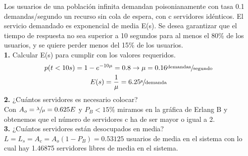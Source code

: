 \begin{exercise}[3]
Los usuarios de una población infinita demandan poisonianamente con tasa 0.1 demandas/segundo un recurso sin cola de espera, con c servidores idénticos. El servicio demandado es exponencial de media E(s). Se desea garantizar que el tiempo de respuesta no sea superior a 10 segundos para al menos el 80\% de los usuarios, y se quiere perder menos del 15\% de los usuarios.\\
\textbf{1.} Calcular E(s) para cumplir con los valores requeridos.\\
\begin{gather*}
p(t<10s)=1-e^{-10\mu}=0.8 \to \mu=0.16\sfrac{\text{demandas}}{\text{segundo}}\\
E(s)=\frac{1}{\mu}=6.25\sfrac{\text{s}}{\text{demanda}}
\end{gather*}
\textbf{2.} ¿Cuántos servidores es necesario colocar?\\
Con $A_o=\sfrac{\lambda}{\mu}=0.625E$ y $P_B<15\%$ miramos en la gráfica de Erlang B y obtenemos que el número de servidores c ha de ser mayor o igual a 2.\\
\textbf{3.} ¿Cuántos servidores están desocupados en media?\\
$L=L_s=A_c=A_o(1-P_B)=0.53125$ usuarios de media en el sistema con lo cual hay 1.46875 servidores libres de media en el sistema.
\end{exercise}
